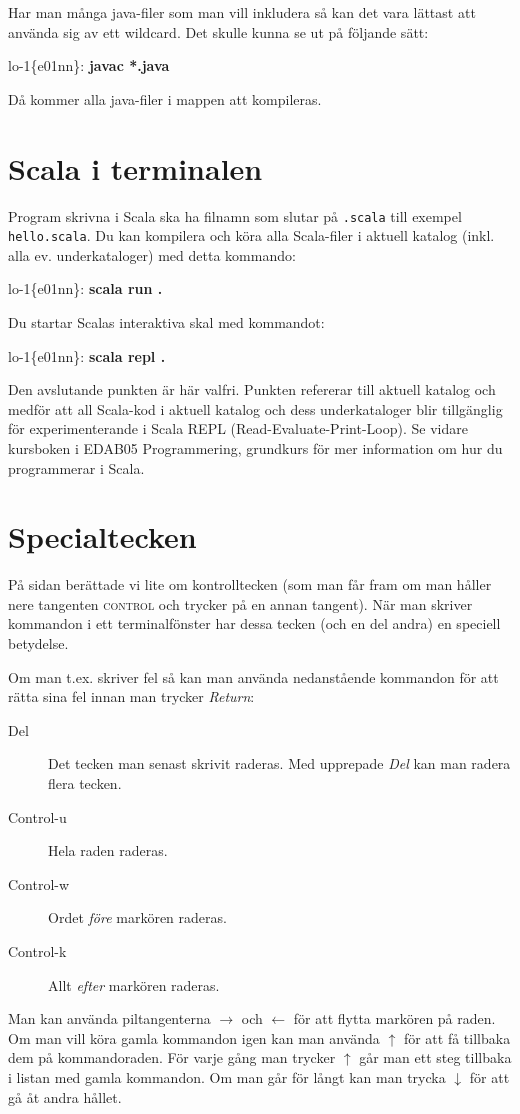 \documentclass[a4paper,twocolumn]{book}
\begin{document}
Har man många java-filer som man vill inkludera så kan det vara lättast att
använda sig av ett wildcard. Det skulle kunna se ut på följande sätt:
\begin{example}
  lo-1\{e01nn\}: \textbf{javac *.java}
\end{example}
Då kommer alla java-filer i mappen att kompileras.

\section{Scala i terminalen}
Program skrivna i Scala ska ha filnamn som slutar på \texttt{.scala} till exempel \texttt{hello.scala}. Du kan kompilera och köra alla Scala-filer i aktuell katalog (inkl. alla ev. underkataloger) med detta kommando:
\begin{example}
  lo-1\{e01nn\}: \textbf{scala run .}
\end{example}

Du startar Scalas interaktiva skal med kommandot:
\begin{example}
  lo-1\{e01nn\}: \textbf{scala repl .}
\end{example}
Den avslutande punkten är här valfri. Punkten refererar till aktuell katalog och medför att all Scala-kod i aktuell katalog och dess underkataloger blir tillgänglig för experimenterande i Scala REPL (Read-Evaluate-Print-Loop).
Se vidare kursboken i EDAB05 Programmering, grundkurs för mer information om hur du programmerar i Scala.


\section{Specialtecken}

På sidan \pageref{control} berättade vi lite om
kontrolltecken (som man får fram om man håller nere tangenten
\textsc{control} och trycker på en annan tangent). När man skriver
kommandon i ett terminalfönster har dessa tecken (och en del andra) en
speciell betydelse.

Om man t.ex. skriver fel så kan man använda nedanstående kommandon för
att rätta sina fel innan man trycker \emph{Return}:
\begin{description}
  \item[Del] Det tecken man senast skrivit raderas. Med upprepade
    \emph{Del} kan man radera flera tecken.
  \item[Control-u] Hela raden raderas.
  \item[Control-w] Ordet \emph{före} markören raderas.
  \item[Control-k] Allt \emph{efter} markören raderas.
\end{description}
Man kan använda piltangenterna $\rightarrow$ och $\leftarrow$ för att
flytta markören på raden. Om man vill köra gamla kommandon igen kan
man använda $\uparrow$ för att få tillbaka dem på kommandoraden. För
varje gång man trycker $\uparrow$ går man ett steg tillbaka i listan
med gamla kommandon. Om man går för långt kan man trycka $\downarrow$
för att gå åt andra hållet.
\end{document}
